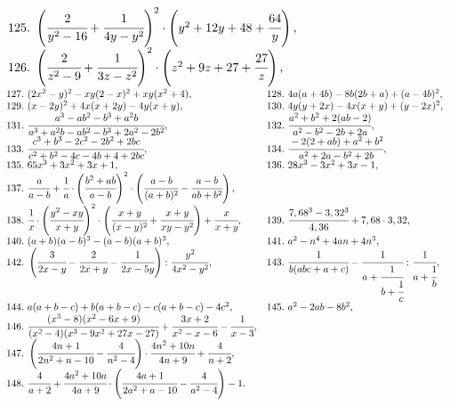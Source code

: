 $\begin{array}{ll}
125.\ \left(\cfrac{2}{y^2-16}+\cfrac{1}{4y-y^2}\right)^2\cdot\left(y^2+12y+48+\cfrac{64}{y}\right),\\
126.\ \left(\cfrac{2}{z^2-9}+\cfrac{1}{3z-z^2}\right)^2\cdot\left(z^2+9z+27+\cfrac{27}{z}\right),
\end{array}$\\
$\begin{array}{ll}
127.\ (2x^2-y)^2-xy(2-x)^2+xy(x^2+4), &
128.\ 4a(a+4b)-8b(2b+a)+(a-4b)^2,\\
129.\ (x-2y)^2+4x(x+2y)-4y(x+y), &
130.\ 4y(y+2x)-4x(x+y)+(y-2x)^2,\\
131.\ \cfrac{a^3-ab^2-b^3+a^2b}{a^3+a^2b-ab^2-b^3+2a^2-2b^2}, &
132.\ \cfrac{a^2+b^2+2(ab-2)}{a^2-b^2-2b+2a},\\
133.\ \cfrac{c^3+b^3-2c^2-2b^2+2bc}{c^2+b^2-4c-4b+4+2bc},&
134.\ \cfrac{-2(2+ab)+a^2+b^2}{a^2+2a-b^2+2b},\\
135.\ 65x^3+3x^2+3x+1,&
136.\ 28x^3-3x^2+3x-1,\\
137.\ \cfrac{a}{a-b}+\cfrac{1}{a}\cdot\left(\cfrac{b^2+ab}{a-b}\right)^2\cdot\left(\cfrac{a-b}{(a+b)^2}-\cfrac{a-b}{ab+b^2}\right),\\
138.\ \cfrac{1}{x}\cdot\left(\cfrac{y^2-xy}{x+y}\right)^2\cdot\left(\cfrac{x+y}{(x-y)^2}+\cfrac{x+y}{xy-y^2}\right)+\cfrac{x}{x+y},&
139.\ \cfrac{7,68^3-3,32^3}{4,36}+7,68\cdot3,32,\\
140.\ (a+b)(a-b)^3-(a-b)(a+b)^3, &
141.\ a^2-n^4+4an+4n^3,\\
142.\ \left(\cfrac{3}{2x-y}-\cfrac{2}{2x+y}-\cfrac{1}{2x-5y}\right):\cfrac{y^2}{4x^2-y^2},&
143.\ \cfrac{1}{b(abc+a+c)}-\cfrac{1}{a+\cfrac{1}{b+\cfrac{1}{c}}}:\cfrac{1}{a+\cfrac{1}{b}},\\
144.\ a(a+b-c)+b(a+b-c)-c(a+b-c)-4c^2, & 145.\ a^2-2ab-8b^2,\\
146.\ \cfrac{(x^3-8)(x^2-6x+9)}{(x^2-4)(x^3-9x^2+27x-27)}+\cfrac{3x+2}{x^2-x-6}-\cfrac{1}{x-3},\\
147.\ \left(\cfrac{4n+1}{2n^2+n-10}-\cfrac{4}{n^2-4}\right)\cdot\cfrac{4n^2+10n}{4n+9}+\cfrac{4}{n+2},\\
148.\ \cfrac{4}{a+2}+\cfrac{4a^2+10a}{4a+9}\cdot\left(\cfrac{4a+1}{2a^2+a-10}-\cfrac{4}{a^2-4}\right)-1.
\end{array}$
\newpage
